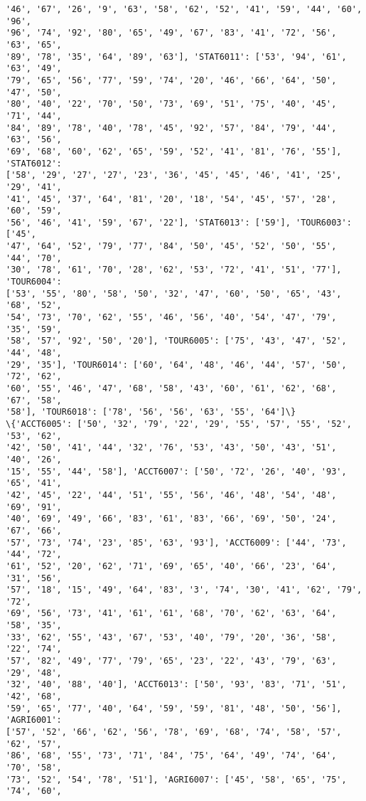 \documentclass[11pt]{article}
\begin{document}
\begin{Verbatim}[commandchars=\\\{\}]
'46', '67', '26', '9', '63', '58', '62', '52', '41', '59', '44', '60', '96',
'96', '74', '92', '80', '65', '49', '67', '83', '41', '72', '56', '63', '65',
'89', '78', '35', '64', '89', '63'], 'STAT6011': ['53', '94', '61', '63', '49',
'79', '65', '56', '77', '59', '74', '20', '46', '66', '64', '50', '47', '50',
'80', '40', '22', '70', '50', '73', '69', '51', '75', '40', '45', '71', '44',
'84', '89', '78', '40', '78', '45', '92', '57', '84', '79', '44', '63', '56',
'69', '68', '60', '62', '65', '59', '52', '41', '81', '76', '55'], 'STAT6012':
['58', '29', '27', '27', '23', '36', '45', '45', '46', '41', '25', '29', '41',
'41', '45', '37', '64', '81', '20', '18', '54', '45', '57', '28', '60', '59',
'56', '46', '41', '59', '67', '22'], 'STAT6013': ['59'], 'TOUR6003': ['45',
'47', '64', '52', '79', '77', '84', '50', '45', '52', '50', '55', '44', '70',
'30', '78', '61', '70', '28', '62', '53', '72', '41', '51', '77'], 'TOUR6004':
['53', '55', '80', '58', '50', '32', '47', '60', '50', '65', '43', '68', '52',
'54', '73', '70', '62', '55', '46', '56', '40', '54', '47', '79', '35', '59',
'58', '57', '92', '50', '20'], 'TOUR6005': ['75', '43', '47', '52', '44', '48',
'29', '35'], 'TOUR6014': ['60', '64', '48', '46', '44', '57', '50', '72', '62',
'60', '55', '46', '47', '68', '58', '43', '60', '61', '62', '68', '67', '58',
'58'], 'TOUR6018': ['78', '56', '56', '63', '55', '64']\}
\{'ACCT6005': ['50', '32', '79', '22', '29', '55', '57', '55', '52', '53', '62',
'42', '50', '41', '44', '32', '76', '53', '43', '50', '43', '51', '40', '26',
'15', '55', '44', '58'], 'ACCT6007': ['50', '72', '26', '40', '93', '65', '41',
'42', '45', '22', '44', '51', '55', '56', '46', '48', '54', '48', '69', '91',
'40', '69', '49', '66', '83', '61', '83', '66', '69', '50', '24', '67', '66',
'57', '73', '74', '23', '85', '63', '93'], 'ACCT6009': ['44', '73', '44', '72',
'61', '52', '20', '62', '71', '69', '65', '40', '66', '23', '64', '31', '56',
'57', '18', '15', '49', '64', '83', '3', '74', '30', '41', '62', '79', '72',
'69', '56', '73', '41', '61', '61', '68', '70', '62', '63', '64', '58', '35',
'33', '62', '55', '43', '67', '53', '40', '79', '20', '36', '58', '22', '74',
'57', '82', '49', '77', '79', '65', '23', '22', '43', '79', '63', '29', '48',
'32', '40', '88', '40'], 'ACCT6013': ['50', '93', '83', '71', '51', '42', '68',
'59', '65', '77', '40', '64', '59', '59', '81', '48', '50', '56'], 'AGRI6001':
['57', '52', '66', '62', '56', '78', '69', '68', '74', '58', '57', '62', '57',
'86', '68', '55', '73', '71', '84', '75', '64', '49', '74', '64', '70', '58',
'73', '52', '54', '78', '51'], 'AGRI6007': ['45', '58', '65', '75', '74', '60',

\end{Verbatim}
\end{document}
